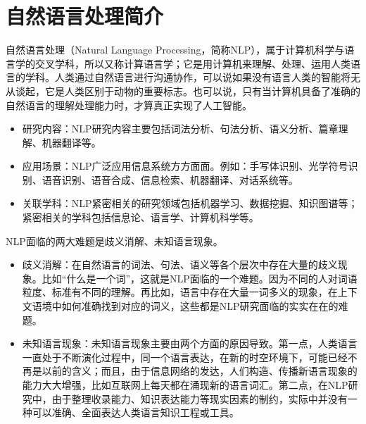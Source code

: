 %
%
%
\chapter{自然语言处理简介}
\label{basic} %

自然语言处理（Natural Language Processing，简称NLP），属于计算机科学与语言学的交叉学科，所以又称计算语言学；它是用计算机来理解、处理、运用人类语言的学科。人类通过自然语言进行沟通协作，可以说如果没有语言人类的智能将无从谈起，它是人类区别于动物的重要标志。也可以说，只有当计算机具备了准确的自然语言的理解处理能力时，才算真正实现了人工智能。
\begin{itemize}
\item 研究内容：NLP研究内容主要包括词法分析、句法分析、语义分析、篇章理解、机器翻译等。
\item 应用场景：NLP广泛应用信息系统方方面面。例如：手写体识别、光学符号识别、语音识别、语音合成、信息检索、机器翻译、对话系统等。
\item 关联学科：NLP紧密相关的研究领域包括机器学习、数据挖掘、知识图谱等；紧密相关的学科包括信息论、语言学、计算机科学等。
\end{itemize}


NLP面临的两大难题是歧义消解、未知语言现象。
\begin{itemize}
\item 歧义消解：在自然语言的词法、句法、语义等各个层次中存在大量的歧义现象。比如“什么是一个词”，这就是NLP面临的一个难题。因为不同的人对词语粒度、标准有不同的理解。再比如，语言中存在大量一词多义的现象，在上下文语境中如何准确找到对应的词义，这些都是NLP研究面临的实实在在的难题。
\item 未知语言现象：未知语言现象主要由两个方面的原因导致。第一点，人类语言一直处于不断演化过程中，同一个语言表达，在新的时空环境下，可能已经不再是以前的含义；而且，由于信息网络的发达，人们构造、传播新语言现象的能力大大增强，比如互联网上每天都在涌现新的语言词汇。第二点，在NLP研究中，由于整理收录能力、知识表达能力等现实因素的制约，实际中并没有一种可以准确、全面表达人类语言知识工程或工具。
\end{itemize}

